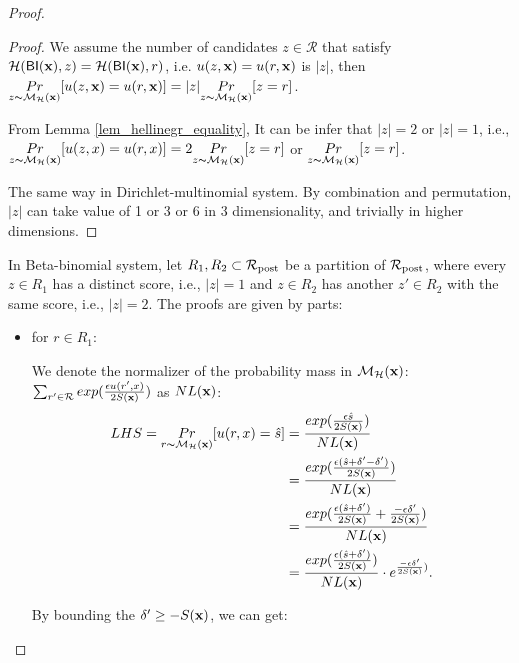 \documentclass{article}
\begin{document}
\begin{proof}
\begin{proof}
 We assume the number of candidates $z \in \mathcal{R}$ that satisfy $\mathcal{H}(\mathsf{BI}(\textbf{x}),z) = \mathcal{H}(\mathsf{BI}(\textbf{x}),r)$, i.e. $u(z,\textbf{x}) = u(r,\textbf{x})$ is $|z|$, then  $\underset{z \thicksim \mathcal{M}_{\mathcal{H}}(\textbf{x})}{Pr}[u(z,\textbf{x}) = u(r,\textbf{x})] = |z| \underset{z \thicksim \mathcal{M}_{\mathcal{H}}(\textbf{x})}{Pr}[z = r]$.

 From Lemma \ref{lem_hellinegr_equality}, It can be infer that $|z| = 2$ or $|z| = 1$, i.e., $\underset{z \thicksim \mathcal{M}_{\mathcal{H}}(\textbf{x})}{Pr}[u(z,x) = u(r,x)] = 2 \underset{z \thicksim \mathcal{M}_{\mathcal{H}}(\textbf{x})}{Pr}[z = r]$ or $\underset{z \thicksim \mathcal{M}_{\mathcal{H}}(\textbf{x})}{Pr}[z = r]$.

 The same way in Dirichlet-multinomial system. By combination and permutation, $|z|$ can take value of 1 or 3 or 6 in 3 dimensionality, and trivially in higher dimensions.
 \end{proof}

 In Beta-binomial system, let $R_1, R_2 \subset \mathcal{R}_{\textup{post}}$ be a partition of $\mathcal{R}_{\textup{post}}$, where every $z \in R_1$ has a distinct score, i.e., $|z| = 1$ and $z \in R_2$ has another $z' \in R_2$ with the same score, i.e., $|z| = 2$. The proofs are given by parts: 

 \begin{itemize}
 	\item for $r \in R_1$:

		We denote the normalizer of the probability mass in $\mathcal{M}_{\mathcal{H}}(\textbf{x})$: $\sum_{r' \in \mathcal{R}}exp(\frac{\epsilon u(r',x)}{2 S(\textbf{x})})$ as $NL(\textbf{x})$:
		\begin{equation*}
		\begin{split}
		LHS 
		  = \underset{r \thicksim \mathcal{M}_{\mathcal{H}}(\textbf{x})}{Pr}[u(r,x) = \hat{s}]
		& = \frac{exp(\frac{\epsilon \hat{s}}{2 S(\textbf{x})})}{NL(\textbf{x})}\\
		& = \frac{exp(\frac{\epsilon (\hat{s} + \delta' - \delta')}{2 S(\textbf{x})})}{NL(\textbf{x})}\\
		& = \frac{exp(\frac{\epsilon (\hat{s} + \delta')}{2 S(\textbf{x})} + \frac{- \epsilon \delta'}{2 S(\textbf{x})})}{NL(\textbf{x})}\\
		& = \frac{exp(\frac{\epsilon (\hat{s} + \delta')}{2 S(\textbf{x})})}{NL(\textbf{x})} \cdot e^{\frac{- \epsilon \delta'}{2 S(\textbf{x})})}.\\
		\end{split}
		\end{equation*}

		By bounding the $\delta' \geq -S(\textbf{x})$, we can get:


\end{itemize}
\end{proof}
\end{document}
